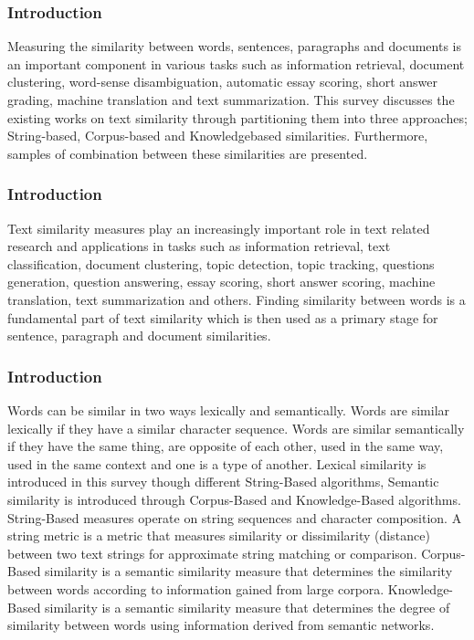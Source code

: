 \begin{frame}
    \frametitle{Introduction}
    \begin{minipage}{\textwidth}
        Measuring the similarity between words, sentences,
        paragraphs and documents is an important component in
        various tasks such as information retrieval, document
        clustering, word-sense disambiguation, automatic essay
        scoring, short answer grading, machine translation and text
        summarization. This survey discusses the existing works on
        text similarity through partitioning them into three
        approaches; String-based, Corpus-based and Knowledgebased
        similarities. Furthermore, samples of combination
        between these similarities are presented.
    \end{minipage}
\end{frame}    

\begin{frame}
    \frametitle{Introduction}
    \begin{minipage}{\textwidth}
        Text similarity measures play an increasingly important role
        in text related research and applications in tasks such as
        information retrieval, text classification, document clustering,
        topic detection, topic tracking, questions generation, question
        answering, essay scoring, short answer scoring, machine
        translation, text summarization and others. Finding similarity
        between words is a fundamental part of text similarity which
        is then used as a primary stage for sentence, paragraph and
        document similarities.      
    \end{minipage}
\end{frame}        
 
\begin{frame}
    \frametitle{Introduction}
    \begin{minipage}{\textwidth} 
        Words can be similar in two ways lexically and semantically. Words are similar lexically if they
        have a similar character sequence. Words are similar
        semantically if they have the same thing, are opposite of each
        other, used in the same way, used in the same context and one
        is a type of another. Lexical similarity is introduced in this
        survey though different String-Based algorithms, Semantic
        similarity is introduced through Corpus-Based and
        Knowledge-Based algorithms. String-Based measures operate
        on string sequences and character composition. A string
        metric is a metric that measures similarity or dissimilarity
        (distance) between two text strings for approximate string
        matching or comparison. Corpus-Based similarity is a
        semantic similarity measure that determines the similarity
        between words according to information gained from large
        corpora. Knowledge-Based similarity is a semantic similarity
        measure that determines the degree of similarity between
        words using information derived from semantic networks. 
    \end{minipage}
\end{frame}    

